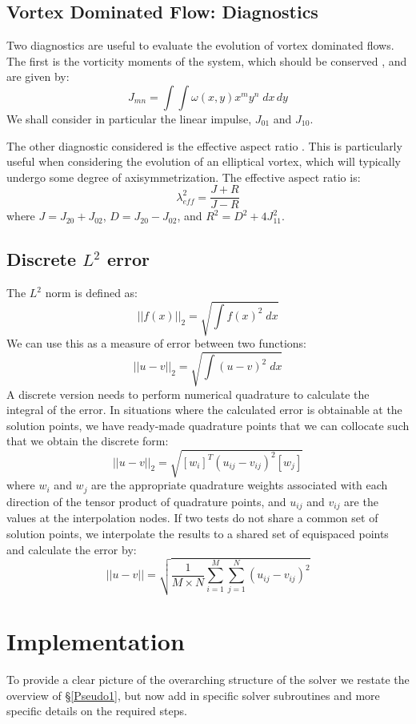 \documentclass[letterpaper,12pt]{report}
\newcommand{\be}{\begin{equation}}
\newcommand{\ee}{\end{equation}}
\begin{document}
\section{Vortex Dominated Flow: Diagnostics}
Two diagnostics are useful to evaluate the evolution of vortex dominated flows. The first is the vorticity moments of the system, which should be conserved \cite{Koum1997}, and are given by:
\be J_{mn}=\int\int \omega(x,y)x^my^n \; dx\,dy \ee
We shall consider in particular the linear impulse, $J_{01}$ and $J_{10}$.

The other diagnostic considered is the effective aspect ratio \cite{Koum1997}. This is particularly useful when considering the evolution of an elliptical vortex, which will typically undergo some degree of axisymmetrization. The effective aspect ratio is:
\be \lambda_{eff}^2 = \frac{J+R}{J-R} \ee
where $J=J_{20}+J_{02}$, $D=J_{20}-J_{02}$, and $R^2=D^2+4J_{11}^2$.

\section{Discrete $L^2$ error}
The $L^2$ norm is defined as:
\be ||f(x)||_2 = \sqrt{\int f(x)^2 \; dx} \ee
We can use this as a measure of error between two functions:
\be ||u-v||_2 = \sqrt{\int (u-v)^2 \; dx} \ee
A discrete version needs to perform numerical quadrature to calculate the integral of the error. In situations where the calculated error is obtainable at the solution points, we have ready-made quadrature points that we can collocate such that we obtain the discrete form:
\be ||u-v||_2 = \sqrt{[w_i]^T(u_{ij}-v_{ij})^2[w_j]} \ee
where $w_i$ and $w_j$ are the appropriate quadrature weights associated with each direction of the tensor product of quadrature points, and $u_{ij}$ and $v_{ij}$ are the values at the interpolation nodes. If two tests do not share a common set of solution points, we interpolate the results to a shared set of equispaced points and calculate the error by:
\be ||u-v|| =\sqrt{\frac{1}{M\times N} \sum_{i=1}^M \sum_{j=1}^N (u_{ij}-v_{ij})^2 }\ee

\chapter{Implementation}
To provide a clear picture of the overarching structure of the solver we restate the overview of \S\ref{Pseudo1}, but now add in specific solver subroutines and more specific details on the required steps.
\end{document}
